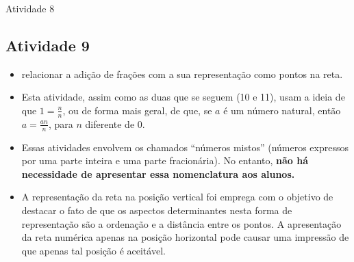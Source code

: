 \begin{multicols}{2}
\begin{resposta*}{Atividade 8}
\end{resposta*}



\clearpage

\subsection{Atividade 9}

\newline \vspace{.15cm}

\begin{itemize} %
  \item     relacionar a adição de frações com a sua representação como pontos na reta.
\end{itemize} %


 \vspace{.15cm}

\begin{itemize} %
  \item     Esta atividade, assim como as duas que se seguem (10 e 11),   usam a ideia de que     $1 = \frac{n}{n}$, ou de forma mais geral, de que, se     $a$     é um número natural, então     $a = \frac{an}{n}$, para     $n$     diferente de 0.
  \item Essas atividades envolvem os chamados ``números mistos'' (números expressos por uma parte inteira e uma parte fracionária). No entanto, {\bf não há necessidade de apresentar essa nomenclatura aos alunos.}
\item A representação da reta na posição vertical foi emprega com o objetivo de destacar o fato de que os aspectos determinantes nesta forma de representação são a ordenação e a distância entre os pontos. A apresentação da reta numérica apenas na posição horizontal pode causar uma impressão de que apenas tal posição é aceitável.

\end{itemize} %

\end{multicols}


